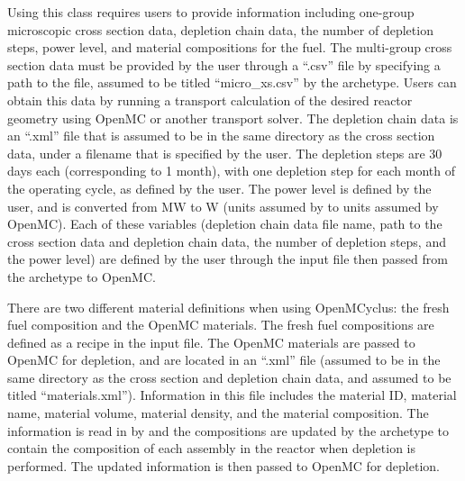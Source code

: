 Using this class requires users to provide information including 
one-group microscopic cross section data, depletion chain data, the 
number of depletion steps, 
power level, and material compositions for the fuel. The multi-group 
cross section data must be provided by the user through a ``.csv'' file by 
specifying a path to the file, assumed to be titled ``micro\_xs.csv'' by the 
archetype. Users can obtain this data by running a transport calculation 
of the desired reactor geometry using OpenMC or another transport solver. 
The depletion chain data is an ``.xml'' file that is assumed to be in the 
same directory as the cross section data, under a filename that is specified 
by the user.
The depletion steps are 30 days each (corresponding to 1 month), 
with one depletion step for each month of the operating cycle, as defined by 
the user. The power level is defined by the user, and is converted from 
MW to W (units assumed by \Cyclus to units assumed by OpenMC). Each of these 
variables (depletion chain data file name, path to the cross section data and 
depletion chain data, the number of depletion steps, and the power level) are 
defined by the user through the \Cyclus input file then passed from the archetype 
to OpenMC. 

There are two different material definitions when using OpenMCyclus:
the fresh fuel composition and the OpenMC materials. The fresh fuel 
compositions are defined as a recipe in the \Cyclus input file. 
The OpenMC materials are passed to OpenMC for depletion, and are 
located in an ``.xml'' file 
(assumed to be in the same directory as the cross section and depletion 
chain data, and assumed to be titled ``materials.xml''). Information in 
this file includes the material ID, material name, material volume, material 
density, and the material composition. The information is 
read in by \Cyclus and the compositions are updated by the archetype to 
contain the composition of each assembly in the reactor when depletion is 
performed. The updated information is then passed to
OpenMC for depletion. 


